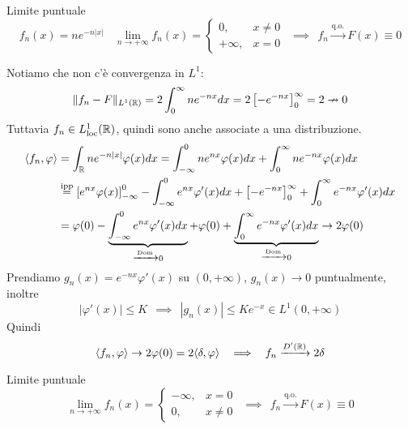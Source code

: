 Limite puntuale
\begin{equation*}
f_{n} (x)=ne^{-n|x|} \ \ \ \ \lim\limits _{n\rightarrow +\infty } f_{n}( x) =\begin{cases}
0, & x\neq 0\\
+\infty , & x=0
\end{cases} \ \ \implies \ \ f_{n}\xrightarrow{\text{q.o.}} F( x) \equiv 0
\end{equation*}

Notiamo che non c'è convergenza in $L^{1}$:
\begin{equation*}
\Vert f_{n} -F\Vert _{L^{1}(\mathbb{R} )} =2\int ^{\infty }_{0} ne^{-nx} dx=2\left[ -e^{-nx}\right]^{\infty }_{0} =2\nrightarrow 0
\end{equation*}
Tuttavia $f_{n} \in L^{1}_{\operatorname{loc}}(\mathbb{R} )$, quindi sono anche associate a una distribuzione.
\begin{equation*}
\begin{aligned}
\langle f_{n} ,\varphi \rangle  & =\int _{\mathbb{R} } ne^{-n| x| } \varphi ( x) dx=\int ^{0}_{-\infty } ne^{nx} \varphi ( x) dx+\int ^{\infty }_{0} ne^{-nx} \varphi ( x) dx\\
 & \overset{\text{ipp}}{=}\left[ e^{nx} \varphi ( x)\right]^{0}_{-\infty } -\int ^{0}_{-\infty } e^{nx} \varphi '( x) dx+\left[ -e^{-nx}\right]^{\infty }_{0} +\int ^{\infty }_{0} e^{-nx} \varphi '( x) dx\\
 & =\varphi ( 0) -\underbrace{\int ^{0}_{-\infty } e^{nx} \varphi '( x) dx}_{\xrightarrow{\text{Dom}} 0} +\varphi ( 0) +\underbrace{\int ^{\infty }_{0} e^{-nx} \varphi '( x) dx}_{\xrightarrow{\text{Dom}} 0}\rightarrow 2\varphi ( 0)
\end{aligned}
\end{equation*}
Prendiamo $g_{n}( x) =e^{-nx} \varphi '( x)$ su $( 0,+\infty )$, $g_{n}( x)\rightarrow 0$ puntualmente, inoltre
\begin{equation*}
| \varphi '( x)| \leqslant K\ \ \implies \ \ | g_{n}( x)| \leqslant Ke^{-x} \in L^{1}( 0,+\infty )
\end{equation*}
Quindi
\begin{equation*}
\langle f_{n} ,\varphi \rangle \rightarrow 2\varphi ( 0) =2\langle \delta ,\varphi \rangle \ \ \implies \ \ f_{n}\xrightarrow{D'(\mathbb{R} )} 2\delta 
\end{equation*}
\Soluzione

Limite puntuale
\begin{equation*}
\lim\limits _{n\rightarrow +\infty } f_{n}( x) =\begin{cases}
-\infty , & x=0\\
0, & x\neq 0
\end{cases} \ \ \implies \ \ f_{n}\xrightarrow{\text{q.o.}} F( x) \equiv 0
\end{equation*}

